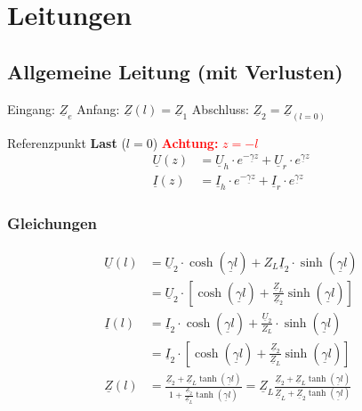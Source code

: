 \section{Leitungen}

\subsection{Allgemeine Leitung (mit Verlusten)}


Eingang: $ \underline{Z}_e $ \quad Anfang: $ \underline{Z}(l) = \underline{Z}_1 $ \quad
Abschluss: $ \underline{Z}_2 = \underline{Z}_{(l=0)}$

Referenzpunkt \textbf{Last} ($ l=0 $) \hspace{5em} \textcolor{red}{\textbf{Achtung:} $ z = -l $}
\begin{align*}
	\underline{U}(z) & = \underline{U}_h \cdot e^{-\underline{\gamma}z} + \underline{U}_r \cdot e^{\underline{\gamma} z}  \\
	\underline{I}(z) & = \underline{I}_h \cdot e^{-\underline{\gamma} z} + \underline{I}_r \cdot e^{\underline{\gamma} z}
\end{align*}

\subsubsection{Gleichungen}\label{sec:Leitungen_allg_Gleichungen}
\begin{align*}
	\underline{U}(l) & = \underline{U}_2 \cdot \cosh(\underline{\gamma}l) + Z_L \underline{I}_2 \cdot \sinh(\underline{\gamma}l)                                 \\
	                 & = \underline{U}_2 \cdot \left[ \cosh(\underline{\gamma} l) + \tfrac{\underline{Z}_L}{\underline{Z}_2} \sinh(\underline{\gamma} l) \right] \\
	\underline{I}(l) & = \underline{I}_2 \cdot \cosh(\underline{\gamma}l) + \frac{\underline{U}_2}{Z_L} \cdot \sinh(\underline{\gamma}l)                         \\
	                 & = \underline{I}_2 \cdot \left[ \cosh(\underline{\gamma} l) + \tfrac{\underline{Z}_2}{\underline{Z}_L} \sinh(\underline{\gamma} l) \right] \\
	\underline{Z}(l) & = \frac{\underline{Z}_2+ \underline{Z}_L\tanh(\underline{\gamma}
		l)}{1+\frac{\underline{Z}_2}{\underline{Z}_L}\tanh(\underline{\gamma} l)} =
	\underline{Z}_L \frac{\underline{Z}_2+ \underline{Z}_L\tanh(\underline{\gamma}
	l)}{{\underline{Z}_L}+{\underline{Z}_2}\tanh(\underline{\gamma} l)}
\end{align*}

